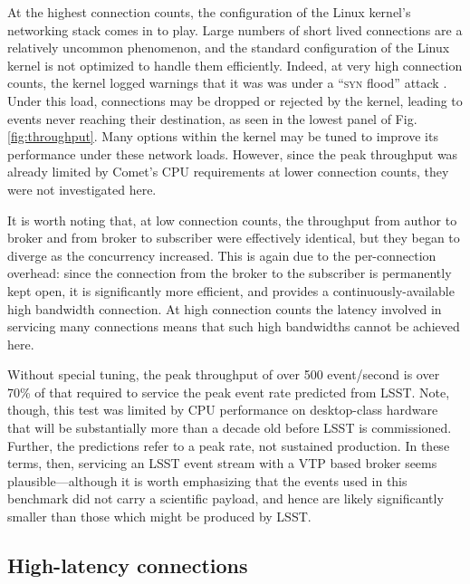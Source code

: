 \documentclass[5p,authoryear]{elsarticle}
\begin{document}
At the highest connection counts, the configuration of the Linux kernel's
networking stack comes in to play. Large numbers of short lived connections
are a relatively uncommon phenomenon, and the standard configuration of the
Linux kernel is not optimized to handle them efficiently. Indeed, at very high
connection counts, the kernel logged warnings that it was was under a
``\textsc{syn} flood'' attack \citep{CERT:1996}. Under this load, connections
may be dropped or rejected by the kernel, leading to events never reaching
their destination, as seen in the lowest panel of Fig. \ref{fig:throughput}.
Many options within the kernel may be tuned to improve its performance under
these network loads. However, since the peak throughput was already limited by
Comet's CPU requirements at lower connection counts, they were not
investigated here.

It is worth noting that, at low connection counts, the throughput from author
to broker and from broker to subscriber were effectively identical, but they
began to diverge as the concurrency increased. This is again due to the
per-connection overhead: since the connection from the broker to the
subscriber is permanently kept open, it is significantly more efficient, and
provides a continuously-available high bandwidth connection. At high
connection counts the latency involved in servicing many connections means
that such high bandwidths cannot be achieved here.

Without special tuning, the peak throughput of over 500 event/second is over
70\% of that required to service the peak event rate predicted from LSST.
Note, though, this test was limited by CPU performance on desktop-class
hardware that will be substantially more than a decade old before LSST is
commissioned. Further, the predictions refer to a peak rate, not sustained
production. In these terms, then, servicing an LSST event stream with a VTP
based broker seems plausible---although it is worth emphasizing that the
events used in this benchmark did not carry a scientific payload, and hence
are likely significantly smaller than those which might be produced by LSST.

\subsection{High-latency connections}
\label{sec:perf:highlatency}
\end{document}
